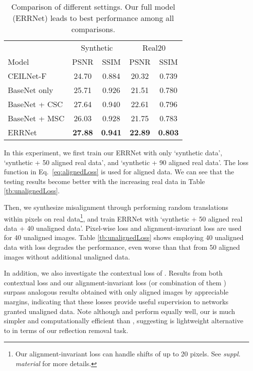 \documentclass[10pt,twocolumn,letterpaper]{article}
\begin{document}
\begin{table}[!t]
\centering
\caption{Comparison of different settings. Our full model (\ie ERRNet) leads to best performance among all comparisons.}
\footnotesize
\begin{tabular}{lcccc} 
		\toprule
		 & \multicolumn{2}{c}{Synthetic} & \multicolumn{2}{c}{Real20} \\
		Model & PSNR & SSIM & PSNR & SSIM \\ 
		\midrule
		CEILNet-F \cite{fan2017generic}  & 24.70 & 0.884 & 20.32 & 0.739 \\ \hline
		\midrule
		BaseNet only & 25.71 &  0.926 &21.51 & 0.780 \\ \hline	
		BaseNet + CSC & 27.64 & 0.940  & 22.61 & 0.796 \\ \hline	
		BaseNet + MSC & 26.03 & 0.928 & 21.75 & 0.783 \\ \hline
		ERRNet & \textbf{27.88} & \textbf{0.941} & \textbf{22.89}
 & \textbf{0.803} \\
		\bottomrule
\end{tabular}
\label{tb:componet}
\end{table}

\vspace{5pt}
In this experiment, we first train our ERRNet with only `synthetic data', `synthetic + 50
aligned real data', and `synthetic + 90 aligned real data'. The loss
function in Eq.~\eqref{eq:alignedLoss} is used for aligned data. We can
see that the testing results become better with the increasing real data in
Table \ref{tb:unalignedLoss}. 

Then, we synthesize misalignment through
performing random translations within  pixels on real data\footnote{Our alignment-invariant loss  can handle shifts of up to 20 pixels.  See \textit{suppl. material} for more details.}, and train
ERRNet with `synthetic + 50 aligned real data + 40 unaligned data'. Pixel-wise loss
 and alignment-invariant
loss  are used for 40 unaligned
images. Table \ref{tb:unalignedLoss} shows employing 40 unaligned data with
 loss degrades the performance, even worse than that from 50 aligned
images without additional unaligned data.


In addition, we also investigate the contextual loss  of
\cite{Mechrez_2018_ECCV}.  Results from both contextual loss  and our alignment-invariant loss
 (or combination of them ) surpass analogous results obtained with only aligned images by appreciable margins, indicating that these losses provide useful supervision
to networks granted unaligned data. Note although  and  perform 
equally well, our  is much simpler and computationally efficient than
, suggesting  is lightweight alternative to  in terms of
our reflection removal task.
\end{document}

